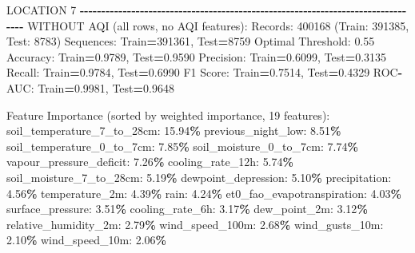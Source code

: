 \documentclass[
  letterpaper,
  DIV=11,
  numbers=noendperiod]{scrartcl}
\newenvironment{Shaded}{\begin{snugshade}}{\end{snugshade}}
\newcommand{\BuiltInTok}[1]{#1}
\newcommand{\DecValTok}[1]{\textcolor[rgb]{0.00,0.00,0.81}{#1}}
\newcommand{\FloatTok}[1]{\textcolor[rgb]{0.00,0.00,0.81}{#1}}
\newcommand{\NormalTok}[1]{#1}
\newcommand{\OperatorTok}[1]{\textcolor[rgb]{0.81,0.36,0.00}{\textbf{#1}}}
\begin{document}
\begin{Shaded}
\begin{Highlighting}[]
\NormalTok{LOCATION }\DecValTok{7}
\OperatorTok{{-}{-}{-}{-}{-}{-}{-}{-}{-}{-}{-}{-}{-}{-}{-}{-}{-}{-}{-}{-}{-}{-}{-}{-}{-}{-}{-}{-}{-}{-}{-}{-}{-}{-}{-}{-}{-}{-}{-}{-}{-}{-}{-}{-}{-}{-}{-}{-}{-}{-}{-}{-}{-}{-}{-}{-}{-}{-}{-}{-}{-}{-}{-}{-}{-}{-}{-}{-}{-}{-}{-}{-}{-}{-}{-}{-}{-}{-}{-}{-}}
\NormalTok{WITHOUT AQI (}\BuiltInTok{all}\NormalTok{ rows, no AQI features):}
\NormalTok{  Records: }\DecValTok{400168}\NormalTok{ (Train: }\DecValTok{391385}\NormalTok{, Test: }\DecValTok{8783}\NormalTok{)}
\NormalTok{  Sequences: Train}\OperatorTok{=}\DecValTok{391361}\NormalTok{, Test}\OperatorTok{=}\DecValTok{8759}
\NormalTok{  Optimal Threshold: }\FloatTok{0.55}
\NormalTok{  Accuracy: Train}\OperatorTok{=}\FloatTok{0.9789}\NormalTok{, Test}\OperatorTok{=}\FloatTok{0.9590}
\NormalTok{  Precision: Train}\OperatorTok{=}\FloatTok{0.6099}\NormalTok{, Test}\OperatorTok{=}\FloatTok{0.3135}
\NormalTok{  Recall: Train}\OperatorTok{=}\FloatTok{0.9784}\NormalTok{, Test}\OperatorTok{=}\FloatTok{0.6990}
\NormalTok{  F1 Score: Train}\OperatorTok{=}\FloatTok{0.7514}\NormalTok{, Test}\OperatorTok{=}\FloatTok{0.4329}
\NormalTok{  ROC}\OperatorTok{{-}}\NormalTok{AUC: Train}\OperatorTok{=}\FloatTok{0.9981}\NormalTok{, Test}\OperatorTok{=}\FloatTok{0.9648}

\NormalTok{  Feature Importance (}\BuiltInTok{sorted}\NormalTok{ by weighted importance, }\DecValTok{19}\NormalTok{ features):}
\NormalTok{    soil\_temperature\_7\_to\_28cm: }\FloatTok{15.94}\OperatorTok{\%}
\NormalTok{    previous\_night\_low: }\FloatTok{8.51}\OperatorTok{\%}
\NormalTok{    soil\_temperature\_0\_to\_7cm: }\FloatTok{7.85}\OperatorTok{\%}
\NormalTok{    soil\_moisture\_0\_to\_7cm: }\FloatTok{7.74}\OperatorTok{\%}
\NormalTok{    vapour\_pressure\_deficit: }\FloatTok{7.26}\OperatorTok{\%}
\NormalTok{    cooling\_rate\_12h: }\FloatTok{5.74}\OperatorTok{\%}
\NormalTok{    soil\_moisture\_7\_to\_28cm: }\FloatTok{5.19}\OperatorTok{\%}
\NormalTok{    dewpoint\_depression: }\FloatTok{5.10}\OperatorTok{\%}
\NormalTok{    precipitation: }\FloatTok{4.56}\OperatorTok{\%}
\NormalTok{    temperature\_2m: }\FloatTok{4.39}\OperatorTok{\%}
\NormalTok{    rain: }\FloatTok{4.24}\OperatorTok{\%}
\NormalTok{    et0\_fao\_evapotranspiration: }\FloatTok{4.03}\OperatorTok{\%}
\NormalTok{    surface\_pressure: }\FloatTok{3.51}\OperatorTok{\%}
\NormalTok{    cooling\_rate\_6h: }\FloatTok{3.17}\OperatorTok{\%}
\NormalTok{    dew\_point\_2m: }\FloatTok{3.12}\OperatorTok{\%}
\NormalTok{    relative\_humidity\_2m: }\FloatTok{2.79}\OperatorTok{\%}
\NormalTok{    wind\_speed\_100m: }\FloatTok{2.68}\OperatorTok{\%}
\NormalTok{    wind\_gusts\_10m: }\FloatTok{2.10}\OperatorTok{\%}
\NormalTok{    wind\_speed\_10m: }\FloatTok{2.06}\OperatorTok{\%}


\end{Highlighting}
\end{Shaded}
\end{document}
